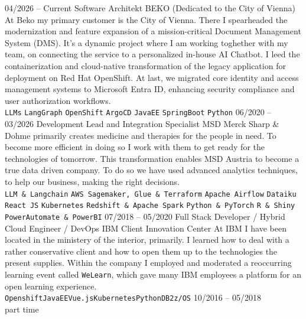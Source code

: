 \documentclass[9pt]{developercv} %
\begin{document}
\begin{entrylist}
	\entry
		{04/2026 -- Current}
		{Software Architekt}
		{BEKO (Dedicated to the City of Vienna)}
		{At Beko my primary customer is the City of Vienna. There I spearheaded the modernization and feature expansion of a mission-critical Document Management System (DMS). It's a dynamic project where I am working toghether with my team, on connecting the service to a personalized in-house AI Chatbot. I leed the containerization and cloud-native transformation of the legacy application for deployment on Red Hat OpenShift. At last, we migrated core identity and access management systems to Microsoft Entra ID, enhancing security compliance and user authorization workflows. \\ 
			\texttt{LLMs} \slashsep \texttt{LangGraph} \slashsep \texttt{OpenShift} \slashsep \texttt{ArgoCD} \slashsep \texttt{JavaEE}  \slashsep \texttt{SpringBoot} \slashsep \texttt{Python}
		}
	\entry
		{06/2020 -- 03/2026}
		{Development Lead and Integration Specialist}
		{MSD}
		{Merck Sharp \& Dohme primarily creates medicine and therapies for the people in need. To become more efficient in doing so I work with them to get ready for the technologies of tomorrow. This transformation enables MSD Austria to become a true data driven company. To do so we have used advanced analytics techniques, to help our business, making the right decisions. \\ 
			\texttt{LLM \& Langchain} \slashsep \texttt{AWS Sagemaker, Glue \& Terraform} \slashsep \texttt{Apache Airflow} \slashsep \texttt{Dataiku}  \slashsep \texttt{React JS} \slashsep \texttt{Kubernetes} \slashsep \texttt{Redshift \& Apache Spark} \slashsep \texttt{Python \& PyTorch} \slashsep \texttt{R \& Shiny}  \slashsep \texttt{PowerAutomate \& PowerBI}
		}
	\entry
		{07/2018 -- 05/2020}
		{Full Stack Developer / Hybrid Cloud Engineer / DevOps}
		{IBM Client Innovation Center}
		{At IBM I have been located in the ministery of the interior, primarily. I learned how to deal with a rather conservative client and how to open them up to the technologies the present supplies. Within the company I employed and moderated a reoccurring learning event called \texttt{WeLearn}, which gave many IBM employees a platform for an open learning experience. \\
			\texttt{Openshift}\slashsep\texttt{JavaEE}\slashsep\texttt{Vue.js}\slashsep\texttt{Kubernetes}\slashsep\texttt{Python}\slashsep\texttt{DB2}\slashsep\texttt{z/OS}
		}
	\entry
		{10/2016 -- 05/2018\\\footnotesize{part time}}

\end{entrylist}
\end{document}
